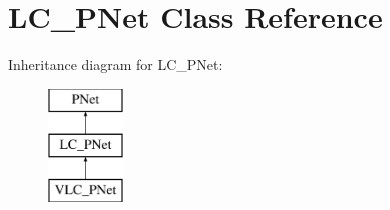\hypertarget{classLC__PNet}{}\section{L\+C\+\_\+\+P\+Net Class Reference}
\label{classLC__PNet}
Inheritance diagram for L\+C\+\_\+\+P\+Net\+:\begin{figure}[H]
\begin{center}
\leavevmode
\includegraphics[height=3.000000cm]{classLC__PNet}
\end{center}
\end{figure}
